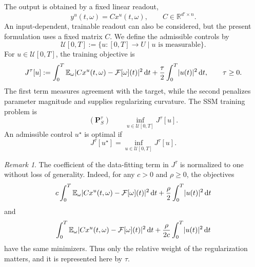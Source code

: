 \documentclass[11pt]{amsart}
\numberwithin{equation}{section} %
\DeclarePairedDelimiter{\abs}{\lvert}{\rvert}
\theoremstyle{remark}
\newtheorem{remark}{Remark}[section]
\begin{document}
The output is obtained by a fixed linear readout,
\[
    y^u(t,\omega)=Cx^u(t,\omega),\qquad C\in\mathbb R^{d'\times n}.
\]
An input-dependent, trainable readout can also be considered, but the present formulation uses a fixed matrix $C$. We define the admissible controls by
\[
    \mathcal U[0,T]
    :=\{u:[0,T]\to U\mid u\text{ is measurable}\}.
\]
For $u\in\mathcal U[0,T]$, the training objective is
\[
    J^\tau[u]
    :=\int_0^T\mathbb E_\omega
    \abs{Cx^u(t,\omega)-\mathcal F[\omega](t)}^2\,\mathrm dt
    +\frac{\tau}{2}\int_0^T\abs{u(t)}^2\,\mathrm dt,
    \qquad \tau\ge0.
\]
The first term measures agreement with the target, while the second penalizes parameter magnitude and supplies regularizing curvature. The SSM training problem is
\[
    (\mathbf P_S^\tau)\qquad
    \inf_{u\in\mathcal U[0,T]}J^\tau[u].
\]
An admissible control $u^\star$ is optimal if
\[
    J^\tau[u^\star]=\inf_{u\in\mathcal U[0,T]}J^\tau[u].
\]

\begin{remark}
    The coefficient of the data-fitting term in $J^\tau$ is normalized to
one without loss of generality. Indeed, for any $c>0$ and $\rho\ge 0$,
the objectives
\[
c\int_0^T \mathbb E_\omega
\abs{Cx^u(t,\omega)-\mathcal F[\omega](t)}^2\,\mathrm dt
+\frac{\rho}{2}\int_0^T\abs{u(t)}^2\,\mathrm dt
\]
and
\[
\int_0^T \mathbb E_\omega
\abs{Cx^u(t,\omega)-\mathcal F[\omega](t)}^2\,\mathrm dt
+\frac{\rho}{2c}\int_0^T\abs{u(t)}^2\,\mathrm dt
\]
have the same minimizers. Thus only the relative weight of the
regularization matters, and it is represented here by $\tau$.
\end{remark}
\end{document}
